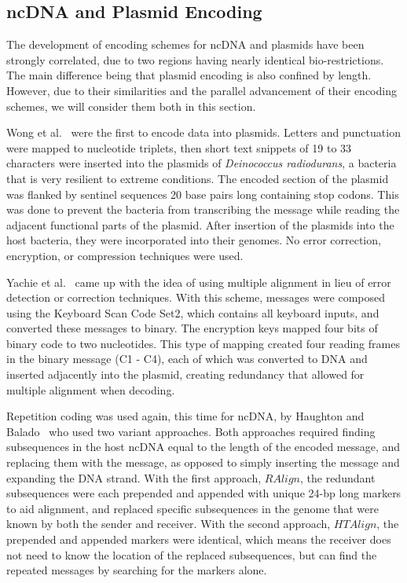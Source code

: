 \documentclass{bioinfo}
\begin{document}
\subsection{ncDNA and Plasmid Encoding}

The development of encoding schemes for ncDNA and plasmids have been strongly correlated, due to two regions having nearly identical bio-restrictions. The main difference being that plasmid encoding is also confined by length. However, due to their similarities and the parallel advancement of their encoding schemes, we will consider them both in this section.

Wong et al.~\cite{WWF2003COTACM} were the first to encode data into plasmids. Letters and punctuation were mapped to nucleotide triplets, then short text snippets of 19 to 33 characters were inserted into the plasmids of \textit{Deinococcus radiodurans}, a bacteria that is very resilient to extreme conditions. The encoded section of the plasmid was flanked by sentinel sequences 20 base pairs long containing stop codons. This was done to prevent the bacteria from transcribing the message while reading the adjacent functional parts of the plasmid. After insertion of the plasmids into the host bacteria, they were incorporated into their genomes. No error correction, encryption, or compression techniques were used.

Yachie et al.~\cite{YSSOT2007BP} came up with the idea of using multiple alignment in lieu of error detection or correction techniques. With this scheme, messages were composed using the Keyboard Scan Code Set2, which contains all keyboard inputs, and converted these messages to binary. The encryption keys mapped four bits of binary code to two nucleotides. This type of mapping created four reading frames in the binary message (C1 - C4), each of which was converted to DNA and inserted adjacently into the plasmid, creating redundancy that allowed for multiple alignment when decoding.

Repetition coding was used again, this time for ncDNA, by Haughton and Balado~\cite{HB2011IEEEICOBAB} who used two variant approaches. Both approaches required finding subsequences in the host ncDNA equal to the length of the encoded message, and replacing them with the message, as opposed to simply inserting the message and expanding the DNA strand. With the first approach, $RAlign$, the redundant subsequences were each prepended and appended with unique 24-bp long markers to aid alignment, and replaced specific subsequences in the genome that were known by both the sender and receiver. With the second approach, $HTAlign$, the prepended and appended markers were identical, which means the receiver does not need to know the location of the replaced subsequences, but can find the repeated messages by searching for the markers alone.
\end{document}
